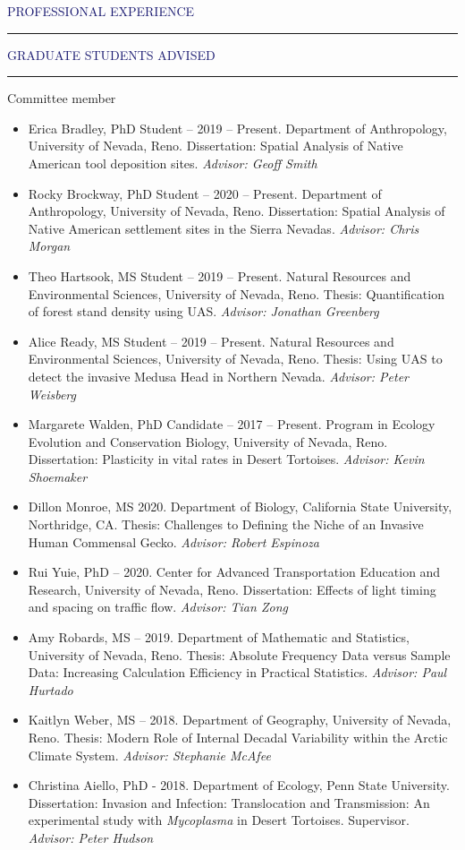 \documentclass{resume} %
\renewenvironment{rSection}[1]{
\sectionskip
\textcolor{MidnightBlue}{\MakeUppercase{#1}}
\sectionlineskip
\hrule
\begin{list}{}{
\setlength{\leftmargin}{1.5em}
}
\item[]
}{
\end{list}
}
\begin{document}
\begin{rSection}{Professional Experience}
\begin{rSection}{Graduate Students Advised}
\begin{rSubsection}{Committee member}{}{}{}
\begin{itemize}
\item Erica Bradley, PhD Student – 2019 – Present. Department of Anthropology, University of Nevada, Reno. Dissertation: Spatial Analysis of Native American tool deposition sites. \textit{Advisor: Geoff Smith}
\item Rocky Brockway, PhD Student – 2020 – Present. Department of Anthropology, University of Nevada, Reno. Dissertation: Spatial Analysis of Native American settlement sites in the Sierra Nevadas. \textit{Advisor: Chris Morgan}
\item Theo Hartsook, MS Student – 2019 – Present. Natural Resources and Environmental Sciences, University of Nevada, Reno. Thesis: Quantification of forest stand density using UAS.  \textit{Advisor: Jonathan Greenberg}
\item Alice Ready, MS Student – 2019 – Present. Natural Resources and Environmental Sciences, University of Nevada, Reno. Thesis: Using UAS to detect the invasive Medusa Head in Northern Nevada.  \textit{Advisor: Peter Weisberg}
\item Margarete Walden, PhD Candidate – 2017 – Present. Program in Ecology Evolution and Conservation Biology, University of Nevada, Reno. Dissertation: Plasticity in vital rates in Desert Tortoises. \textit{Advisor: Kevin Shoemaker}
\item Dillon Monroe, MS 2020. Department of Biology, California State University, Northridge, CA. Thesis: Challenges to Defining the Niche of an Invasive Human Commensal Gecko. \textit{Advisor: Robert Espinoza}
\item Rui Yuie, PhD – 2020. Center for Advanced Transportation Education and Research, University of Nevada, Reno.  Dissertation: Effects of light timing and spacing on traffic flow. \textit{Advisor: Tian Zong}
\item Amy Robards, MS – 2019. Department of Mathematic and Statistics, University of Nevada, Reno. Thesis: Absolute Frequency Data versus Sample Data: Increasing Calculation Efficiency in Practical Statistics. \textit{Advisor: Paul Hurtado}
\item Kaitlyn Weber, MS – 2018. Department of Geography, University of Nevada, Reno. Thesis: Modern Role of Internal Decadal Variability within the Arctic Climate System. \textit{Advisor: Stephanie McAfee}
\item Christina Aiello, PhD - 2018. Department of Ecology, Penn State University. Dissertation: Invasion and Infection: Translocation and Transmission: An experimental study with \textit {Mycoplasma} in Desert Tortoises. Supervisor. \textit{Advisor: Peter Hudson}

\end{itemize}
\end{rSubsection}
\end{rSection}
\end{rSection}
\end{document}
